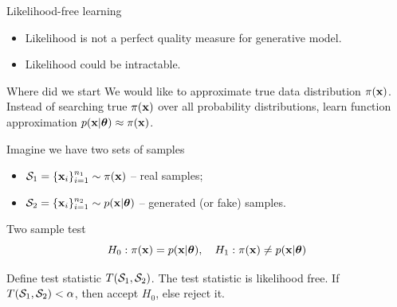 \begin{frame}{Likelihood-free learning}
	\begin{itemize}
		\item Likelihood is not a perfect quality measure for generative model.
		\item Likelihood could be intractable.
	\end{itemize}
	\begin{block}{Where did we start}
	 We would like to approximate true data distribution $\pi(\mathbf{x})$.
		Instead of searching true $\pi(\mathbf{x})$ over all probability distributions, learn function approximation $p(\mathbf{x} | \boldsymbol{\theta}) \approx \pi(\mathbf{x})$.
	\end{block}
	Imagine we have two sets of samples 
	\begin{itemize}
		\item $\mathcal{S}_1 = \{\mathbf{x}_i\}_{i=1}^{n_1} \sim \pi(\mathbf{x})$ -- real samples;
		\item $\mathcal{S}_2 = \{\mathbf{x}_i\}_{i=1}^{n_2} \sim p(\mathbf{x} | \boldsymbol{\theta})$ -- generated (or fake) samples.
	\end{itemize}
	\begin{block}{Two sample test}
		\vspace{-0.3cm}
		\[
			H_0: \pi(\mathbf{x}) = p(\mathbf{x} | \boldsymbol{\theta}), \quad H_1: \pi(\mathbf{x}) \neq p(\mathbf{x} | \boldsymbol{\theta})
		\]
	\end{block}
	Define test statistic $T(\mathcal{S}_1, \mathcal{S}_2)$. The test statistic is likelihood free.
	If $T(\mathcal{S}_1, \mathcal{S}_2) < \alpha$, then accept $H_0$, else reject it.
\end{frame}
